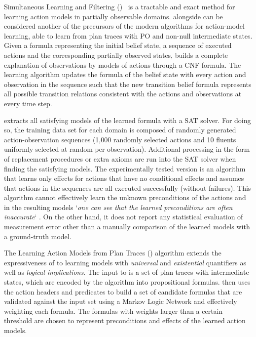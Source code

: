 Simultaneous Learning and Filtering (\textbf{\SLAF})~\cite{AmirC08} is a tractable and exact method for learning action models in partially observable domains. \SLAF alongside \ARMS can be considered another of the precursors of the modern algorithms for action-model learning, able to learn from plan traces with PO and non-null intermediate states. Given a formula representing the initial belief state, a sequence of executed actions and the corresponding partially observed states, \SLAF builds a complete explanation of observations by models of actions through a CNF formula. The learning algorithm updates the formula of the belief state with every action and observation in the sequence such that the new transition belief formula represents all possible transition relations consistent with the actions and observations at every time step.

\SLAF extracts all satisfying models of the learned formula with a SAT solver. For doing so, the training data set for each domain is composed of randomly generated action-observation sequences  (1,000 randomly selected actions and 10 fluents uniformly selected at random per observation). Additional processing in the form of replacement procedures or extra axioms are run into the SAT solver when finding the satisfying models. The experimentally tested \SLAF version is an algorithm that learns only effects for actions that have no conditional effects and assumes that actions in the sequences are all executed successfully (without failures). This algorithm cannot effectively learn the unknown preconditions of the actions and in the resulting models `\emph{one can see that the learned preconditions are often inaccurate}` \cite{AmirC08}. On the other hand, it does not report any statistical evaluation of measurement error other than a manually comparison of the learned models with a ground-truth model.

The Learning Action Models from Plan Traces (\textbf{\LAMP}) \cite{ZhuoYHL10} algorithm extends the expressiveness of \ARMS to learning models with {\em universal} and {\em existential} quantifiers as well as {\em logical implications}. The input to \LAMP is a set of plan traces with intermediate states, which are encoded by the algorithm into propositional formulas. \LAMP then uses the action headers and predicates to build a set of candidate formulas that are validated against the input set using a Markov Logic Network and effectively weighting each formula. The formulas with weights larger than a certain threshold are chosen to represent preconditions and effects of the learned action models.

